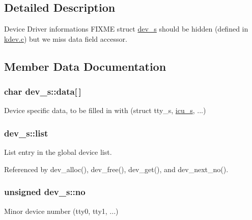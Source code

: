 \subsection{Detailed Description}
Device Driver informations F\-I\-X\-M\-E struct \hyperlink{structdev__s}{dev\-\_\-s} should be hidden (defined in \hyperlink{kdev_8c}{kdev.\-c}) but we miss data field accessor. 

\subsection{Member Data Documentation}
\hypertarget{structdev__s_a77c17663043315d33ca8e0e6d420c475}{
\subsubsection[{data}]{\setlength{\rightskip}{0pt plus 5cm}char dev\-\_\-s\-::data\mbox{[}$\,$\mbox{]}}}\label{structdev__s_a77c17663043315d33ca8e0e6d420c475}


Device specific data, to be filled in with (struct tty\-\_\-s, \hyperlink{structicu__s}{icu\-\_\-s}, ...) 

\hypertarget{structdev__s_a4fdb485fdfb2cfdf956289636560a9ff}{
\subsubsection[{list}]{ dev\-\_\-s\-::list}}\label{structdev__s_a4fdb485fdfb2cfdf956289636560a9ff}


List entry in the global device list. 



Referenced by dev\-\_\-alloc(), dev\-\_\-free(), dev\-\_\-get(), and dev\-\_\-next\-\_\-no().

\hypertarget{structdev__s_aa9bb06b8905eac21cced3a03f91d4f15}{
\subsubsection[{no}]{\setlength{\rightskip}{0pt plus 5cm}unsigned dev\-\_\-s\-::no}}\label{structdev__s_aa9bb06b8905eac21cced3a03f91d4f15}


Minor device number (tty0, tty1, ...) 




